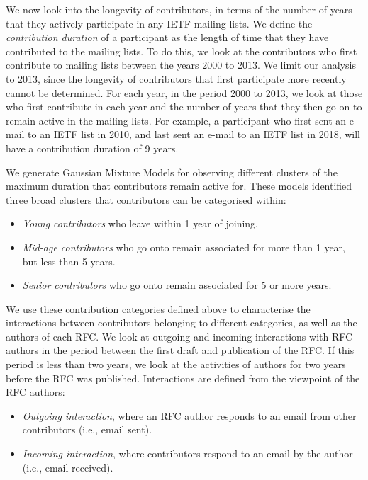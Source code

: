 \documentclass[twocolumn,10pt]{article}
\newcommand{\pb}[1]{\vspace{0.75ex}\noindent{\textbf{#1}}}
\begin{document}
\pb{Contribution duration.}
We now look into the longevity of contributors, in terms of the number of
years that they actively participate in any IETF mailing lists. We define
the \textit{contribution duration} of a participant as the length of time
that they have contributed to the mailing lists.  To do this, we look at
the contributors who first contribute to mailing lists between the years
2000 to 2013. We limit our analysis to 2013, since the longevity of
contributors that first participate more recently cannot be determined.
For each year, in the period 2000 to 2013, we look at those who first
contribute in each year and the number of years that they then go on to
remain active in the mailing lists. For example, a participant who first
sent an e-mail to an IETF list in 2010, and last sent an e-mail to an IETF
list in 2018, will have a contribution duration of 9 years.

We generate Gaussian Mixture Models for observing different clusters of the
maximum duration that contributors remain active for.  These models
identified three broad clusters that contributors can be categorised
within:

\begin{itemize}
    \item \emph{Young contributors} who leave within 1 year of joining.
    \item \emph{Mid-age contributors} who go onto remain associated for
      more than 1 year, but less than 5 years.
    \item \emph{Senior contributors} who go onto remain associated for 5 or
      more years.
\end{itemize}

We use these contribution categories defined above to characterise the
interactions between contributors belonging to different categories, as
well as the authors of each RFC. We look at outgoing and incoming
interactions with RFC authors in the period between the first draft and
publication of the RFC. If this period is less than two years, we look at
the activities of authors for two years before the RFC was published.
Interactions are defined from the viewpoint of the RFC authors:

\begin{itemize}
    \item \textit{Outgoing interaction}, where an RFC author responds to an
      email from other contributors (i.e., email sent).
    \item \textit{Incoming interaction}, where contributors respond to an
      email by the author (i.e., email received).
\end{itemize}
\end{document}
